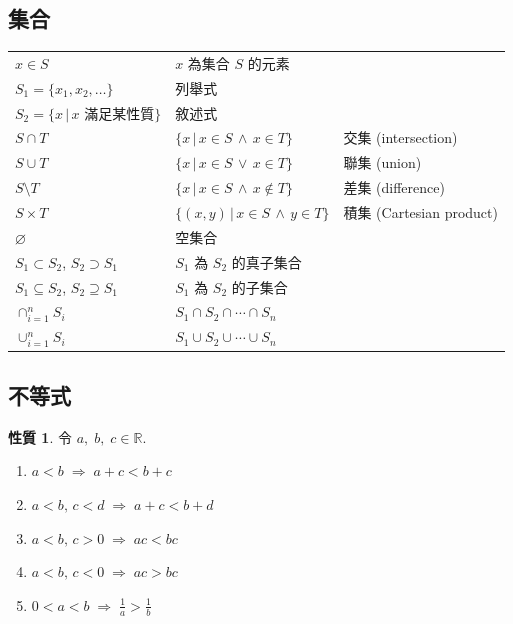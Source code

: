 \documentclass[12pt,a4paper]{extarticle}
\newcommand{\ds}{\displaystyle}
\newcommand{\ie}{\;\Longrightarrow\;}
\theoremstyle{definition}
\newtheorem*{prp}{性質}
\begin{document}
\vspace{-5mm}
\subsection*{集合}

\vspace{-3mm}
\begin{table}[!htbp]
  \centering
  \begin{tabular}{lll}
    \toprule
    $x\in S$ & $x$ 為集合 $S$ 的元素 &  \\
    $S_1 =\{x_1, x_2, \ldots\}$ & 列舉式   &  \\
    $S_2 =\{ x\,|\, x \text{ 滿足某性質}\}$ & 敘述式 & \\
    $S\cap T$ & $\{x\,|\, x\in S\,\wedge\,x\in T\}$ & 交集 (intersection)    \\
    $S\cup T$ & $\{x\,|\, x\in S\,\vee\,x\in T\}$ & 聯集 (union)    \\
    $S\setminus T$ & $\{x\,|\, x\in S\,\wedge\,x\not\in T\}$ & 差集 (difference)   \\
    $S\times T$ & $\{(x, y)\,|\, x\in S\,\wedge\,y\in T\}$ & 積集 (Cartesian product)  \\
    $\varnothing$ & 空集合 & \\
    $S_1\subset S_2$, $S_2\supset S_1$ & $S_1$ 為 $S_2$ 的真子集合 & \\
    $S_1\subseteq S_2$, $S_2\supseteq S_1$ & $S_1$ 為 $S_2$ 的子集合 & \\
    $\ds\cap_{i=1}^n S_i$ & $S_1\cap S_2\cap\cdots\cap S_n$ &    \\
    $\ds\cup_{i=1}^n S_i$ & $S_1\cup S_2\cup\cdots\cup S_n$ &    \\
    \bottomrule
  \end{tabular}
\end{table}

\vspace{-5mm}
\subsection*{不等式}
\begin{prp}
  令 $a,\;b,\;c\in\mathbb{R}$. 
  \setlength{\columnsep}{-20mm}
  \begin{multicols}{2}
    \begin{enumerate}\setlength\itemsep{0em}
      \item $\ds a < b \ie a + c < b + c$
      \item $\ds a < b, \,c < d \ie a + c < b + d$
      \item $\ds a < b, \,c > 0 \ie a c < b c$
      \item $\ds a < b, \,c < 0 \ie a c > b c$
      \item $\ds0 < a < b \ie \frac{1}{a} > \frac{1}{b}$
    \end{enumerate}
  \end{multicols}
\end{prp}
\end{document}
